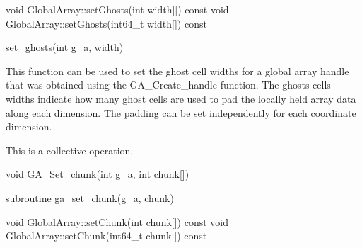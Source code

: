 \documentclass[12pt]{article}
\begin{document}
\begin{cxxapi}
\begin{cxxcode}
void GlobalArray::setGhosts(int width[]) const
void GlobalArray::setGhosts(int64_t width[]) const
\end{cxxcode}
\begin{funcargs}
\end{funcargs}
\end{cxxapi}

\begin{pyapi}
\begin{pycode}
set_ghosts(int g_a, width)
\end{pycode}
\end{pyapi}

\begin{desc}

  This function can be used to set the ghost cell widths for a global
  array handle that was obtained using the GA_Create_handle function.
  The ghosts cells widths indicate how many ghost cells are used to
  pad the locally held array data along each dimension. The padding
  can be set independently for each coordinate dimension.

  This is a collective operation.

\end{desc}


\begin{capi}
\begin{ccode}
void GA_Set_chunk(int g_a, int chunk[])
\end{ccode}
\begin{funcargs}
\end{funcargs}
\end{capi}

\begin{fapi}
\begin{fcode}
subroutine ga_set_chunk(g_a, chunk)
\end{fcode}
\begin{funcargs}
\end{funcargs}
\end{fapi}

\begin{cxxapi}
\begin{cxxcode}
void GlobalArray::setChunk(int chunk[]) const
void GlobalArray::setChunk(int64_t chunk[]) const
\end{cxxcode}
\begin{funcargs}
\end{funcargs}
\end{cxxapi}
\end{document}
